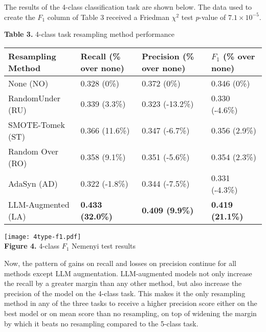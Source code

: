 \documentclass[runningheads]{llncs}
\newenvironment{nscenter}
 {\parskip=0pt\par\nopagebreak\centering}
 {\par\noindent\ignorespacesafterend}
\begin{document}
The results of the 4-class classification task are shown below. The data used to create the $F_1$ column of Table 3 received a Friedman $\chi^2$ test \emph{p}-value of $7.1 \times 10^{-5}$.
\begin{nscenter}
{\bf Table 3.} 4-class task resampling method performance\\

\begin{tabular}{|l|l|l|l|}
\hline
Resampling Method & Recall (\% over none) & Precision (\% over none) & $F_1$ (\% over none) \\\hline
 None (NO) & 0.328 (0\%) & 0.372 (0\%) & 0.346 (0\%) \\\hline
 RandomUnder (RU) & 0.339 (3.3\%) & 0.323 (-13.2\%) & 0.330 (-4.6\%) \\\hline
 SMOTE-Tomek (ST) & 0.366 (11.6\%) & 0.347 (-6.7\%) & 0.356 (2.9\%) \\\hline
 Random Over (RO) & 0.358 (9.1\%) & 0.351 (-5.6\%) & 0.354 (2.3\%) \\\hline
 AdaSyn (AD) & 0.322 (-1.8\%) & 0.344 (-7.5\%) & 0.331 (-4.3\%) \\\hline
 LLM-Augmented (LA) & {\bf 0.433 (32.0\%)} & {\bf 0.409 (9.9\%)} & {\bf 0.419 (21.1\%)} \\\hline
\end{tabular}

\texttt{[image: 4type-f1.pdf]}\\
{\bf Figure 4.} 4-class $F_1$ Nemenyi test results\\
\end{nscenter}
Now, the pattern of gains on recall and losses on precision continue for all methods except LLM augmentation. LLM-augmented models not only increase the recall by a greater margin than any other method, but also increase the precision of the model on the 4-class task. This makes it the only resampling method in any of the three tasks to receive a higher precision score either on the best model or on mean score than no resampling, on top of widening the margin by which it beats no resampling compared to the 5-class task.
\end{document}
